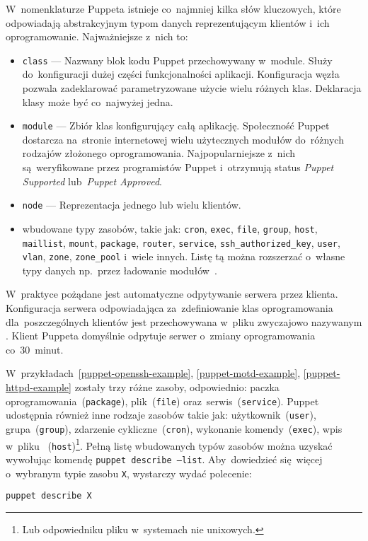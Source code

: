\documentclass[thesis]{subfiles}
\begin{document}
W~nomenklaturze Puppeta istnieje co~najmniej kilka słów kluczowych, które odpowiadają abstrakcyjnym typom danych reprezentującym klientów i~ich oprogramowanie. Najważniejsze z~nich to:
\begin{itemize}
\item \texttt{class} --- Nazwany blok kodu Puppet przechowywany w~module. Służy do~konfiguracji dużej części funkcjonalności aplikacji. Konfiguracja węzła pozwala zadeklarować parametryzowane użycie wielu różnych klas. Deklaracja klasy może być co~najwyżej jedna.
\item \texttt{module} --- Zbiór klas konfigurujący całą aplikację. Społeczność Puppet dostarcza na~stronie internetowej  wielu użytecznych modułów do~różnych rodzajów złożonego oprogramowania. Najpopularniejsze z~nich są~weryfikowane przez programistów Puppet i~otrzymują status \emph{Puppet Supported} lub~\emph{Puppet Approved}.
\item \texttt{node} --- Reprezentacja jednego lub wielu klientów.
\item wbudowane typy zasobów, takie jak: \texttt{cron}, \texttt{exec}, \texttt{file}, \texttt{group}, \texttt{host}, \texttt{maillist}, \texttt{mount}, \texttt{package}, \texttt{router}, \texttt{service}, \texttt{ssh\_authorized\_key}, \texttt{user}, \texttt{vlan}, \texttt{zone}, \texttt{zone\_pool} i~wiele innych. Listę tą można rozszerzać o~własne typy danych np.~przez ładowanie modułów~\cite{puppet-resources-types}.
\end{itemize}
W~praktyce pożądane jest automatyczne odpytywanie serwera przez klienta. Konfiguracja serwera odpowiadająca za~zdefiniowanie klas oprogramowania dla~poszczególnych klientów jest przechowywana w~pliku zwyczajowo nazywanym . Klient Puppeta domyślnie odpytuje serwer o~zmiany oprogramowania co~30~minut.

W~przykładach~\ref{puppet-openssh-example}, \ref{puppet-motd-example}, \ref{puppet-httpd-example} zostały trzy różne zasoby, odpowiednio: paczka oprogramowania~(\texttt{package}), plik~(\texttt{file}) oraz~serwis~(\texttt{service}). Puppet udostępnia również inne rodzaje zasobów takie jak: użytkownik~(\texttt{user}), grupa~(\texttt{group}), zdarzenie cykliczne~(\texttt{cron}), wykonanie komendy~(\texttt{exec}), wpis w~pliku ~(\texttt{host})\footnote{Lub odpowiedniku pliku  w~systemach nie unixowych.}. Pełną listę wbudowanych typów zasobów można uzyskać wywołując komendę \texttt{puppet describe --list}. Aby~dowiedzieć się~więcej o~wybranym typie zasobu \texttt{X}, wystarczy wydać polecenie:
\begin{center}
\texttt{puppet describe~X}
\end{center}
\end{document}
